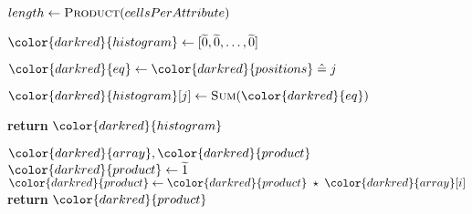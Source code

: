 \begin{algorithm}[H]
\begin{algorithmic}[1]
    \EndFor

    \State $length \gets \textsc{Product}(cellsPerAttribute)$

    \State ${\color{darkred}{histogram}} \gets [\enc{0}, \enc{0}, \dots, \enc{0}]$
    


      \State ${\color{darkred}{eq}} \gets {\color{darkred}{positions}} \heq j$

      \State ${\color{darkred}{histogram}}[j] \gets \textsc{Sum}({\color{darkred}{eq}})$

    \EndFor

    \State \textbf{return} {${\color{darkred}{histogram}}$}
\EndProcedure

\begin{spacing}{0.5}
\end{spacing}

\Require ${\color{darkred}{array}}, {\color{darkred}{product}}$
    \State ${\color{darkred}{product}} \gets \enc{1}$
        \State ${\color{darkred}{product}} \gets {\color{darkred}{product}} \hmul {\color{darkred}{array}}[i]$
    \EndFor
    \State \textbf{return} {${\color{darkred}{product}}$}
\EndProcedure

\end{algorithmic}
\end{algorithm}

